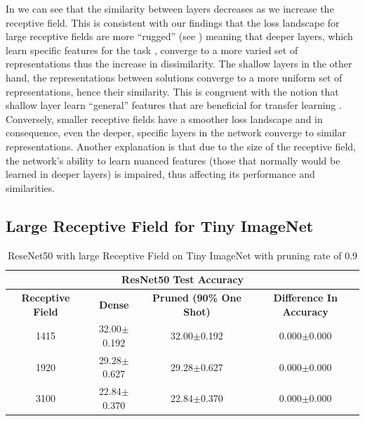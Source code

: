     In  we can see that the similarity between layers decreases as we increase the receptive
    field. This is consistent with our findings that the loss landscape for large receptive fields are more ``rugged''
    (see )
    meaning that deeper layers, which learn specific features for the task \citep{yosinskiHowTransferableAre2014,
    roAutoLRLayerwisePruning2021}, converge to a more varied set of representations thus the
    increase in dissimilarity. The shallow layers in the other hand, the representations between solutions converge to a
    more uniform set of representations, hence their similarity. This is congruent with the notion that shallow layer
    learn ``general'' features that are beneficial for transfer learning \citep{roAutoLRLayerwisePruning2021}.
    Conversely, smaller receptive fields have a smoother loss landscape and in consequence, even the deeper, specific layers
    in the network converge to similar representations. Another explanation is that due to the size of the receptive
    field, the network's ability to learn nuanced features (those that normally would be learned in deeper layers) is
    impaired, thus affecting its performance and similarities.



\subsection{Large Receptive Field for Tiny ImageNet}
\label{subsec:LargeRFTI}
\begin{table}[H]
  \centering
\begin{tabular}{@{}cccc@{}}\toprule
\multicolumn{4}{c}{\textbf{ResNet50 Test Accuracy}}                                            \\ \midrule
\textbf{Receptive Field} & \textbf{Dense}  & \textbf{Pruned (90\% One Shot)} & \textbf{Difference In Accuracy} \\ \midrule
1415                     & 32.00$\pm$0.192 & 32.00$\pm$0.192 & 0.000$\pm$0.000                 \\
1920                     & 29.28$\pm$0.627 & 29.28$\pm$0.627 & 0.000$\pm$0.000                 \\
3100                     & 22.84$\pm$0.370 & 22.84$\pm$0.370 & 0.000$\pm$0.000                 \\ \bottomrule
\end{tabular}
\caption{ReseNet50 with large Receptive Field on Tiny ImageNet  with pruning rate of 0.9}
\label{tab:tiny imagenet largeRF one shot pruning rate 09}
\end{table}

